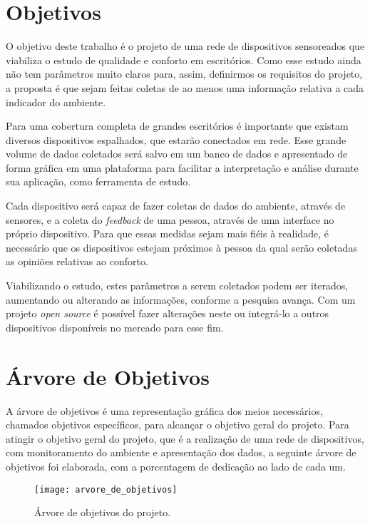 \documentclass[../monografia.tex]{subfiles}
\begin{document}
\section{Objetivos}

O objetivo deste trabalho é o projeto de uma rede de dispositivos sensoreados que viabiliza o estudo de qualidade e conforto em escritórios. Como esse estudo ainda não tem parâmetros muito claros para, assim, definirmos os requisitos do projeto, a proposta é que sejam feitas coletas de ao menos uma informação relativa a cada indicador do ambiente. 

Para uma cobertura completa de grandes escritórios é importante que existam diversos dispositivos espalhados, que estarão conectados em rede. Esse grande volume de dados coletados será salvo em um banco de dados e apresentado de forma gráfica em uma plataforma para facilitar a interpretação e análise durante sua aplicação, como ferramenta de estudo. 

Cada dispositivo será capaz de fazer coletas de dados do ambiente, através de sensores, e a coleta do \textit{feedback} de uma pessoa, através de uma interface no próprio dispositivo. Para que essas medidas sejam mais fiéis à realidade, é necessário que os dispositivos estejam próximos à pessoa da qual serão coletadas as opiniões relativas ao conforto. 

Viabilizando o estudo, estes parâmetros a serem coletados podem ser iterados, aumentando ou alterando as informações, conforme a pesquisa avança. Com um projeto \textit{open source} é possível fazer alterações neste ou integrá-lo a outros dispositivos disponíveis no mercado para esse fim. 

\section{Árvore de Objetivos} 
A árvore de objetivos é uma representação gráfica dos meios necessários, chamados objetivos específicos, para alcançar o objetivo geral do projeto. 
Para atingir o objetivo geral do projeto, que é a realização de uma rede de dispositivos, com monitoramento do ambiente e apresentação dos dados, a seguinte árvore de objetivos foi elaborada, com a porcentagem de dedicação ao lado de cada um.

\begin{figure}[h!]
\texttt{[image: arvore\_de\_objetivos]}
\centering
\caption{Árvore de objetivos do projeto.}
\label{fig:objective-tree}
\end{figure}
\end{document}
